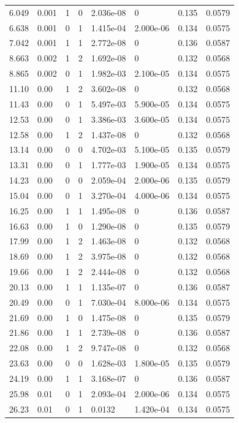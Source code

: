 \documentclass[preview]{standalone}
\begin{document}
{{\begin{tabular}{L{1.2cm}C{1.2cm} C{0.3cm}C{0.5cm} C{1.4cm}C{1.4cm} C{1.4cm}C{1.4cm}}
  6.049  &  0.001  & 1     &  0 &  2.036e-08  & 0  & 0.135 &  0.0579   \\ 
  6.638  &  0.001  & 0     &  1 &  1.415e-04  & 2.000e-06  & 0.134 &  0.0575   \\ 
  7.042  &  0.001  & 1     &  1 &  2.772e-08  & 0  & 0.136 &  0.0587   \\ 
  8.663  &  0.002  & 1     &  2 &  1.692e-08  & 0  & 0.132 &  0.0568   \\ 
  8.865  &  0.002  & 0     &  1 &  1.982e-03  & 2.100e-05  & 0.134 &  0.0575   \\ 
  11.10  &  0.00  & 1     &  2 &  3.602e-08  & 0  & 0.132 &  0.0568   \\ 
  11.43  &  0.00  & 0     &  1 &  5.497e-03  & 5.900e-05  & 0.134 &  0.0575   \\ 
  12.53  &  0.00  & 0     &  1 &  3.386e-03  & 3.600e-05  & 0.134 &  0.0575   \\ 
  12.58  &  0.00  & 1     &  2 &  1.437e-08  & 0  & 0.132 &  0.0568   \\ 
  13.14  &  0.00  & 0     &  0 &  4.702e-03  & 5.100e-05  & 0.135 &  0.0579   \\ 
  13.31  &  0.00  & 0     &  1 &  1.777e-03  & 1.900e-05  & 0.134 &  0.0575   \\ 
  14.23  &  0.00  & 0     &  0 &  2.059e-04  & 2.000e-06  & 0.135 &  0.0579   \\ 
  15.04  &  0.00  & 0     &  1 &  3.270e-04  & 4.000e-06  & 0.134 &  0.0575   \\ 
  16.25  &  0.00  & 1     &  1 &  1.495e-08  & 0  & 0.136 &  0.0587   \\ 
  16.63  &  0.00  & 1     &  0 &  1.290e-08  & 0  & 0.135 &  0.0579   \\ 
  17.99  &  0.00  & 1     &  2 &  1.463e-08  & 0  & 0.132 &  0.0568   \\ 
  18.69  &  0.00  & 1     &  2 &  3.975e-08  & 0  & 0.132 &  0.0568   \\ 
  19.66  &  0.00  & 1     &  2 &  2.444e-08  & 0  & 0.132 &  0.0568   \\ 
  20.13  &  0.00  & 1     &  1 &  1.135e-07  & 0  & 0.136 &  0.0587   \\ 
  20.49  &  0.00  & 0     &  1 &  7.030e-04  & 8.000e-06  & 0.134 &  0.0575   \\ 
  21.69  &  0.00  & 1     &  0 &  1.475e-08  & 0  & 0.135 &  0.0579   \\ 
  21.86  &  0.00  & 1     &  1 &  2.739e-08  & 0  & 0.136 &  0.0587   \\ 
  22.08  &  0.00  & 1     &  2 &  9.747e-08  & 0  & 0.132 &  0.0568   \\ 
  23.63  &  0.00  & 0     &  0 &  1.628e-03  & 1.800e-05  & 0.135 &  0.0579   \\ 
  24.19  &  0.00  & 1     &  1 &  3.168e-07  & 0  & 0.136 &  0.0587   \\ 
  25.98  &  0.01  & 0     &  1 &  2.093e-04  & 2.000e-06  & 0.134 &  0.0575   \\ 
  26.23  &  0.01  & 0     &  1 &  0.0132  & 1.420e-04  & 0.134 &  0.0575   \\ 
\hline 
\end{tabular} 

}}
\end{document}
